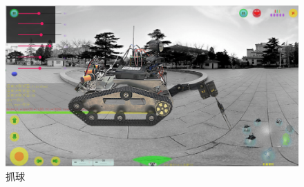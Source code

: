 \documentclass{ctexart}
\begin{document}
\begin{figure}[H]
    \centering
    \includegraphics[width = .8\textwidth]{./figure/抓球.png}
    \caption{抓球}
\end{figure}
\end{document}
